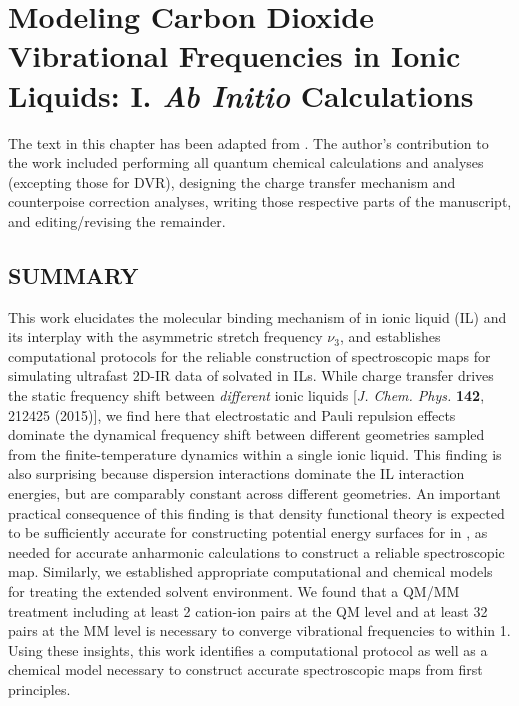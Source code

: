 \documentclass[%
  class = book,%
  crop = false,%
  float = true,%
  multi = true,%
  preview = false,%
]{standalone}
\newcommand{\cotil}{\ce{CO2}\textendash{}IL\xspace}%
\newcommand{\caps}[1]{\uppercase{#1}}
\begin{document}
\chapter[\ce{CO2}-IL Cluster Model Validation]{Modeling Carbon Dioxide Vibrational Frequencies in Ionic Liquids: I. \textit{Ab Initio} Calculations}
\label{ch:paper_02}

The text in this chapter has been adapted from . The author's contribution to the work included performing all quantum chemical calculations and analyses (excepting those for DVR), designing the charge transfer mechanism and counterpoise correction analyses, writing those respective parts of the manuscript, and editing/revising the remainder.

\section{\texorpdfstring{\caps{Summary}}{Summary}}
\label{paper_02:sec:summary}

This work elucidates the molecular binding mechanism of  in \ce{[C4C1im][PF6]} ionic liquid (IL) and its interplay with the  asymmetric stretch frequency \(\nu_{3}\), and establishes computational protocols for the reliable construction of spectroscopic maps for simulating ultrafast 2D-IR data of  solvated in ILs. While charge transfer drives the static frequency shift between \emph{different} ionic liquids [\emph{J. Chem. Phys.} \textbf{142}, 212425 (2015)], we find here that electrostatic and Pauli repulsion effects dominate the dynamical frequency shift between different geometries sampled from the finite-temperature dynamics within a single ionic liquid. This finding is also surprising because dispersion interactions dominate the \cotil interaction energies, but are comparably constant across different geometries. An important practical consequence of this finding is that density functional theory is expected to be sufficiently accurate for constructing potential energy surfaces for  in \ce{[C4C1im][PF6]}, as needed for accurate anharmonic calculations to construct a reliable spectroscopic map. Similarly, we established appropriate computational and chemical models for treating the extended solvent environment. We found that a QM/MM treatment including at least \num{2} cation-ion pairs at the QM level and at least \num{32} pairs at the MM level is necessary to converge vibrational frequencies to within \SI{1}{\wavenumber}. Using these insights, this work identifies a computational protocol as well as a chemical model necessary to construct accurate spectroscopic maps from first principles.
\end{document}
